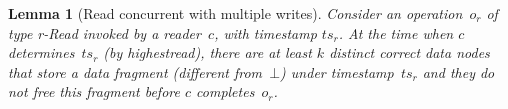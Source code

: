 \documentclass[oribibl]{llncs}
\newtheorem{lemma}[theorem]{Lemma}
\theoremstyle{definition-boldhead}
\newcommand{\var}[1]{\textit{#1}}
\newcommand{\op}[1]{\textsl{#1}}
\newcommand{\dir}{\var{dir}\xspace}
\newcommand{\nodes}{nodes\xspace}
\begin{document}
\newcommand{\opwi}[1]{\ensuremath{o_{w,#1}}\xspace}
\newcommand{\updatewi}[1]{\dir-\ensuremath{\var{Update}_{w,#1}}\xspace}
\newcommand{\scanwi}[1]{\dir-\ensuremath{\var{Scan}_{w, #1}}\xspace}
\newcommand{\updaterd}{\dir-\ensuremath{\var{Update}_r}\xspace}
\newcommand{\scanrd}{\dir-\ensuremath{\var{Scan}_r}\xspace}

\begin{lemma}[Read concurrent with multiple writes]\label{lem:concurrent}
  Consider an operation~$o_r$ of type \var{r}-\op{Read} invoked by a
  reader~$c$, with timestamp $\var{ts}_r$.  At the time when $c$
  determines~$\var{ts}_r$ (by \op{highestread}), there are at least
  $k$ distinct correct data \nodes that store a data fragment
  (different from~$\bot$) under timestamp~$\var{ts}_r$ and they do not
  free this fragment before $c$ completes~$o_r$.
\end{lemma}
\end{document}
